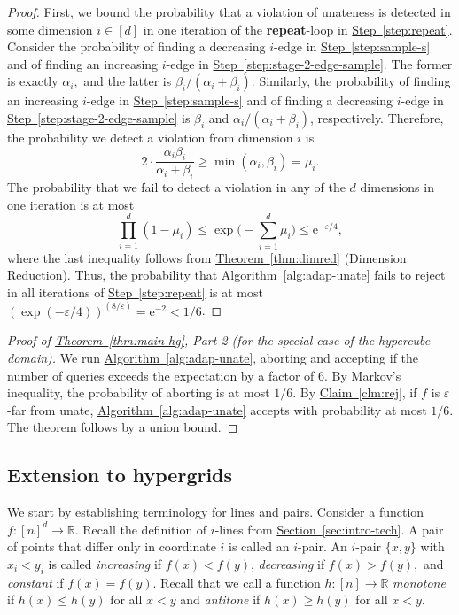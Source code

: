 \documentclass[11pt]{article}
\numberwithin{equation}{section}
\theoremstyle{definition}
\theoremstyle{plain}
\newcommand{\R}{\mathbb R}
\newcommand{\eee}{\mathrm e}
\newcommand{\expref}[2]{\hyperref[#2]{#1~\ref{#2}}}
\newcommand{\eps}{\varepsilon}
\newcommand{\Sec}[1]{\expref{Section}{sec:#1}}
\newcommand{\Alg}[1]{\expref{Algorithm}{alg:#1}}
\newcommand{\Thm}[1]{\expref{Theorem}{thm:#1}}
\newcommand{\Clm}[1]{\expref{Claim}{clm:#1}}
\newcommand{\Step}[1]{\expref{Step}{step:#1}}
\begin{document}
\begin{proof}
First, we bound the probability that a violation of unateness is detected in some dimension $i \in [d]$ in one iteration of the {\bf repeat}-loop in \Step{repeat}.
Consider the probability of finding a %
decreasing $i$-edge in \Step{sample-s} and of finding an %
increasing $i$-edge in \Step{stage-2-edge-sample}.
The former is exactly $\alpha_i,$ and the latter is ${\beta_i}/{(\alpha_i+\beta_i)}$.
Similarly, the probability of finding an increasing $i$-edge in \Step{sample-s} and of finding a decreasing $i$-edge in \Step{stage-2-edge-sample} is $\beta_i$ and ${\alpha_i}/{(\alpha_i+\beta_i)}$, 
respectively.  %
Therefore, the probability we detect a violation from dimension $i$ is
\[2 \cdot \frac{\alpha_i \beta_i}{\alpha_i+\beta_i} \geq \min(\alpha_i,\beta_i) = \mu_i.\]
The probability that we fail to detect a violation in any of the $d$ dimensions in one iteration is at most
\[\prod_{i =1}^d (1-\mu_i) \leq \exp\big(-\sum_{i = 1}^d \mu_i\big) \leq \eee^{-\eps/4},\]
where the last inequality follows from \Thm{dimred} (Dimension Reduction).
Thus, the probability that \Alg{adap-unate} fails to reject in all iterations of \Step{repeat} is at most
$(\exp(-\eps/4))^{(8/\eps)} = \eee^{-2} < 1/6$.
\end{proof}

\begin{proof}[{Proof of \Thm{main-hg}, Part 2} (for the special case of the hypercube domain)]
We run \Alg{adap-unate}, aborting and accepting if the number of queries exceeds the expectation by a factor of 6. By Markov's inequality, the probability of aborting is at most $1/6$.
By \Clm{rej}, if $f$ is $\eps$-far from unate, \Alg{adap-unate} accepts with probability at most $1/6$. The theorem follows by a union bound.
\end{proof}

\subsection{Extension to hypergrids}\label{sec:hypergrids}
We start by establishing terminology for lines and pairs.
Consider a function $f:[n]^d\to\R$.
Recall the definition of $i$-lines from \Sec{intro-tech}.
A pair of points that differ only in coordinate $i$ is called an $i$-pair.
An $i$-pair $\{x,y\}$ with $x_i < y_i$ is called \emph{increasing} if $f(x) < f(y)$, \emph{decreasing} if $f(x) > f(y),$ and \emph{constant} if $f(x) = f(y)$. Recall that we call a function $h:[n] \to \R$ \emph{monotone} if $h(x)\leq h(y)$ for all $x<y$ and 
%
%
\emph{antitone} %
if $h(x)\geq h(y)$ for all $x < y$.
\end{document}
